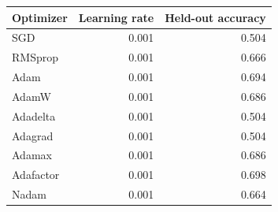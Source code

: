 \begin{tabular}{lrr}
\toprule
Optimizer & Learning rate & Held-out accuracy \\
\midrule
SGD & 0.001 & 0.504 \\
RMSprop & 0.001 & 0.666 \\
Adam & 0.001 & 0.694 \\
AdamW & 0.001 & 0.686 \\
Adadelta & 0.001 & 0.504 \\
Adagrad & 0.001 & 0.504 \\
Adamax & 0.001 & 0.686 \\
Adafactor & 0.001 & 0.698 \\
Nadam & 0.001 & 0.664 \\
\bottomrule
\end{tabular}
